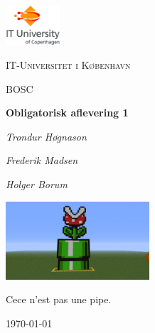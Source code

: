 
\begin{titlepage}
	\centering
	\includegraphics[width=0.15\textwidth]{logo}\par\vspace{1cm}
	{\scshape\LARGE IT-Universitet i København \par}
	\vspace{1cm}
	{\scshape\Large BOSC\par}
	\vspace{1.5cm}
	{\huge\bfseries Obligatorisk aflevering 1\par}
	\vspace{2cm}
	{\Large\itshape Trondur Høgnason\par}
	{\Large\itshape Frederik Madsen\par}
	{\Large\itshape Holger Borum\par}
	\vspace{1 cm}
	\includegraphics[width=0.4\textwidth]{pipe}\par\vspace{1cm}
	Cece n'est pas une pipe.\\
\vspace{1cm}
	{\large \today\par}
\end{titlepage}
